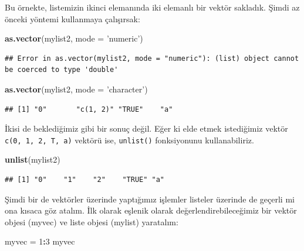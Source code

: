 \documentclass[]{book}
\newenvironment{Shaded}{\begin{snugshade}}{\end{snugshade}}
\newcommand{\DataTypeTok}[1]{\textcolor[rgb]{0.13,0.29,0.53}{#1}}
\newcommand{\DecValTok}[1]{\textcolor[rgb]{0.00,0.00,0.81}{#1}}
\newcommand{\KeywordTok}[1]{\textcolor[rgb]{0.13,0.29,0.53}{\textbf{#1}}}
\newcommand{\NormalTok}[1]{#1}
\newcommand{\OperatorTok}[1]{\textcolor[rgb]{0.81,0.36,0.00}{\textbf{#1}}}
\newcommand{\StringTok}[1]{\textcolor[rgb]{0.31,0.60,0.02}{#1}}
\begin{document}
Bu örnekte, listemizin ikinci elemanında iki elemanlı bir vektör
sakladık. Şimdi az önceki yöntemi kullanmaya çalışırsak:

\begin{Shaded}
\begin{Highlighting}[]
\KeywordTok{as.vector}\NormalTok{(mylist2, }\DataTypeTok{mode =} \StringTok{'numeric'}\NormalTok{)}
\end{Highlighting}
\end{Shaded}

\begin{verbatim}
## Error in as.vector(mylist2, mode = "numeric"): (list) object cannot be coerced to type 'double'
\end{verbatim}

\begin{Shaded}
\begin{Highlighting}[]
\KeywordTok{as.vector}\NormalTok{(mylist2, }\DataTypeTok{mode =} \StringTok{'character'}\NormalTok{)}
\end{Highlighting}
\end{Shaded}

\begin{verbatim}
## [1] "0"       "c(1, 2)" "TRUE"    "a"
\end{verbatim}

İkisi de beklediğimiz gibi bir sonuç değil. Eğer ki elde etmek
istediğimiz vektör
\texttt{c(\textquotesingle{}0\textquotesingle{},\ \textquotesingle{}1\textquotesingle{},\ \textquotesingle{}2\textquotesingle{},\ \textquotesingle{}T\textquotesingle{},\ \textquotesingle{}a\textquotesingle{})}
vektörü ise, \texttt{unlist()} fonksiyonunu kullanabiliriz.

\begin{Shaded}
\begin{Highlighting}[]
\KeywordTok{unlist}\NormalTok{(mylist2)}
\end{Highlighting}
\end{Shaded}

\begin{verbatim}
## [1] "0"    "1"    "2"    "TRUE" "a"
\end{verbatim}

Şimdi bir de vektörler üzerinde yaptığımız işlemler listeler üzerinde de
geçerli mi ona kısaca göz atalım. İlk olarak eşlenik olarak
değerlendirebileceğimiz bir vektör objesi (myvec) ve liste objesi
(mylist) yaratalım:

\begin{Shaded}
\begin{Highlighting}[]
\NormalTok{myvec =}\StringTok{ }\DecValTok{1}\OperatorTok{:}\DecValTok{3}
\NormalTok{myvec}
\end{Highlighting}
\end{Shaded}
\end{document}
